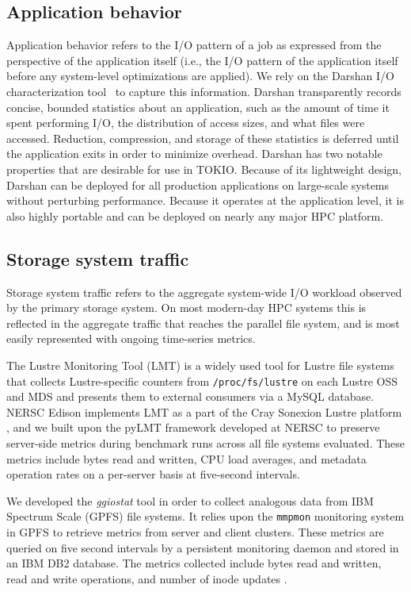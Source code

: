 \subsection{Application behavior} \label{sec:methods/darshan}

Application behavior refers to the I/O pattern of a job as expressed from
the perspective of the application itself (i.e., the I/O pattern of the
application itself before any system-level optimizations are applied).
We rely on the Darshan I/O characterization tool~\cite{carns200924}
to capture this information.  Darshan transparently records concise,
bounded statistics about an application, such as the amount of time it
spent performing I/O, the distribution of access sizes, and what files
were accessed.  Reduction, compression, and storage of these statistics
is deferred until the application exits in order to minimize overhead.
Darshan has two notable properties that are desirable for use in TOKIO.
Because of its lightweight design, Darshan can be deployed for all
production applications on large-scale systems without perturbing
performance.  Because it operates at the application level, it is also highly
portable and can be deployed on nearly any major HPC platform.

\subsection{Storage system traffic}

Storage system traffic refers to the aggregate system-wide I/O workload
observed by the primary storage system.  On most modern-day HPC systems this
is reflected in the aggregate traffic that reaches the parallel file
system, and is most easily represented with ongoing time-series metrics.

\label{sec:methods/lmt}
The Lustre Monitoring Tool (LMT) is a widely used tool for Lustre file systems that collects Lustre-specific counters from \texttt{/proc/fs/lustre} on each Lustre OSS and MDS and presents them to external consumers via a MySQL database.
NERSC Edison implements LMT
as a part of the Cray Sonexion Lustre platform \cite{Keopp2014}, and we built
upon the pyLMT framework developed at NERSC \cite{Uselton2009} to preserve
server-side metrics during benchmark runs across all file systems evaluated.
These metrics include bytes read and written, CPU load averages, and metadata
operation rates on a per-server basis at five-second intervals.

\label{sec:methods/ggiostat}
We developed the \emph{ggiostat} tool in order to collect analogous data from
IBM Spectrum Scale (GPFS) file systems.    It relies upon the
\texttt{mmpmon} monitoring system in GPFS to retrieve metrics from server and
client clusters.  These metrics are queried on five second intervals by a
persistent monitoring daemon and stored in an IBM DB2 database.
The metrics collected include bytes read and written,
read and write operations, and number of inode updates . 


